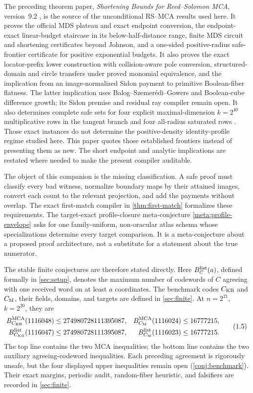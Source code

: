 \documentclass[a4paper,11pt]{amsart}
\theoremstyle{remark}
\DeclareMathOperator{\MCA}{MCA}
\begin{document}
The preceding theorem paper, \emph{Shortening Bounds for Reed--Solomon MCA},
version~9.2 \cite{ChoShortening}, is the source of the unconditional
RS--MCA results used here.  It proves the official MDS plateau and exact
endpoint conversion, the endpoint-exact linear-budget staircase in its
below-half-distance range, finite MDS circuit and shortening certificates
beyond Johnson, and a one-sided positive-radius safe-frontier certificate
for positive exponential budgets.  It also proves the exact locator-prefix
lower construction with collision-aware pole conversion, structured-domain
and circle transfers under proved monomial equivalence, and the implication
from an image-normalized Sidon payment to primitive Boolean-fiber flatness.
The latter implication uses Balog--Szemer\'edi--Gowers and Boolean-cube
difference growth; its Sidon premise and residual ray compiler remain open.
It also determines complete safe sets for four explicit maximal-dimension
\(k=2^{40}\) multiplicative rows in the tangent branch and four all-radius
saturated rows \cite[Corollary~1.5 and Proposition~B.2]{ChoShortening}.
Those exact instances do not determine the positive-density identity-profile regime
studied here.
This paper quotes those established frontiers instead of presenting them as
new.  The short endpoint and analytic implications are restated where needed
to make the present compiler auditable.

The object of this companion is the missing classification.  A safe proof
must classify every bad witness, normalize boundary maps by their attained
images, convert each count to the relevant projection, and add the payments
without overlap.  The exact first-match compiler in
\cref{thm:first-match} formalizes these requirements.  The target-exact
profile-closure meta-conjecture \cref{meta:profile-envelope} asks for one
family-uniform, non-oracular atlas schema whose specializations determine
every target comparison.  It is a meta-conjecture about a proposed proof
architecture, not a substitute for a statement about the true numerator.

The stable finite conjectures are therefore stated directly.  Here
\(B_C^{\rm list}(a)\), defined formally in \cref{sec:setup}, denotes the
maximum number of codewords of \(C\) agreeing with one received word on at
least \(a\) coordinates.  The benchmark codes \(C_{\rm KB}\) and
\(C_{\rm M}\), their fields, domains, and targets are defined in
\cref{sec:finite}.  At
\(n=2^{21}\), \(k=2^{20}\), they are
\[
 \begin{aligned}
 B_{C_{\rm KB}}^{\MCA}(1116048)&\le274980728111395087,&
 B_{C_{\rm M}}^{\MCA}(1116024)&\le16777215,\\
 B_{C_{\rm KB}}^{\rm list}(1116047)&\le274980728111395087,&
 B_{C_{\rm M}}^{\rm list}(1116023)&\le16777215.
 \end{aligned}                                      \tag{1.5}\label{eq:intro-benchmarks}
\]
The top line contains the two MCA inequalities; the bottom line contains the
two auxiliary agreeing-codeword inequalities.  Each preceding agreement is rigorously
unsafe, but the four displayed upper inequalities remain open
(\cref{conj:benchmark}).  Their exact margins, periodic audit, random-fiber
heuristic, and falsifiers are recorded in \cref{sec:finite}.
\end{document}
